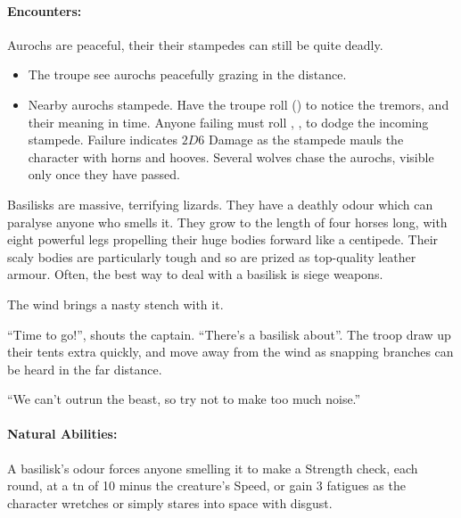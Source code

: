 \begin{multicols}{2}
\paragraph{Encounters:} Aurochs are peaceful, their their stampedes can still be quite deadly.

\begin{itemize}

  \item
  The troupe see aurochs peacefully grazing in the distance.
  \item
  Nearby aurochs stampede.
  Have the troupe roll  (\tn[8]) to notice the tremors, and their meaning in time.
  Anyone failing must roll , \tn[9], to dodge the incoming stampede.
  Failure indicates $2D6$ Damage as the stampede mauls the character with horns and hooves.
  Several wolves chase the aurochs, visible only once they have passed.

\end{itemize}

\label{basilisk}

Basilisks are massive, terrifying lizards.
They have a deathly odour which can paralyse anyone who smells it.
They grow to the length of four horses long, with eight powerful legs propelling their huge bodies forward like a centipede.
Their scaly bodies are particularly tough and so are prized as top-quality leather armour.
Often, the best way to deal with a basilisk is siege weapons.

\begin{boxtext}

  The wind brings a nasty stench with it.

  ``Time to go!'', shouts the captain.
  ``There's a basilisk about''.
  The troop draw up their tents extra quickly, and move away from the wind as snapping branches can be heard in the far distance.

  ``We can't outrun the beast, so try not to make too much noise.''

\end{boxtext}

\basilisk

\paragraph{Natural Abilities:} A basilisk's odour forces anyone smelling it to make a Strength check, each round, at a \gls{tn} of 10 minus the creature's Speed, or gain 3 \glspl{fatigue} as the character wretches or simply stares into space with disgust.


\end{multicols}
